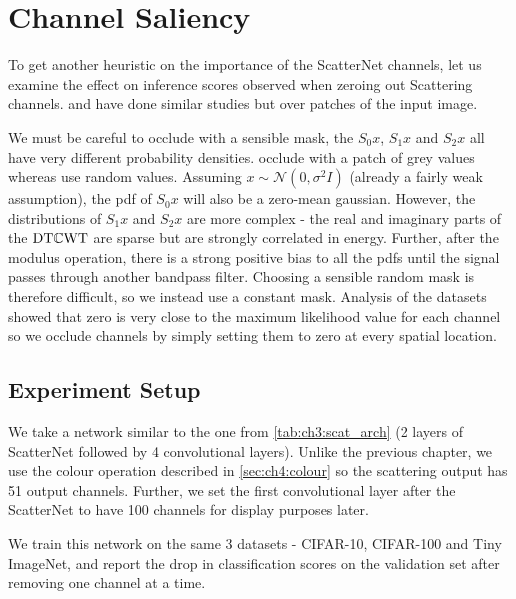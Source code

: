 \section{Channel Saliency}\label{sec:ch4:occlusion}
To get another heuristic on the importance of the ScatterNet channels, let us examine
the effect on inference scores observed when zeroing out Scattering channels.
\citeauthor{zeiler_visualizing_2014} \cite{zeiler_visualizing_2014} and 
\citeauthor{zhou_object_2014} \cite{zhou_object_2014} have done similar studies but
over patches of the input image. 

We must be careful to occlude with a sensible mask, the $S_0x$, $S_1x$ and $S_2x$
all have very different probability densities. \cite{zeiler_visualizing_2014}
occlude with a patch of grey values whereas \cite{zhou_object_2014} use random
values. Assuming $x \sim \mathcal{N}(0, \sigma^2I)$ (already a fairly weak
assumption), the pdf of $S_0x$ will also be a zero-mean gaussian. However, the
distributions of $S_1x$ and $S_2x$ are more complex - the real and imaginary
parts of the $\mathrm{DT}\mathbb{C}\mathrm{WT}$ are sparse but are strongly correlated in energy. Further,
after the modulus operation, there is a strong positive bias to all the pdfs
until the signal passes through another bandpass filter. Choosing a sensible
random mask is therefore difficult, so we instead use a constant mask. Analysis
of the datasets showed that zero is very close to the maximum likelihood value for
each channel so we occlude channels by simply setting them to zero at every
spatial location.

\subsection{Experiment Setup}
We take a network similar to the one from
\autoref{tab:ch3:scat_arch} (2 layers of ScatterNet followed by 4 convolutional
layers). Unlike the previous chapter, we use the colour operation described in 
\autoref{sec:ch4:colour} so the scattering output has 51 output channels. Further,
we set the first convolutional layer after the ScatterNet to have 
100 channels for display purposes later. 

We train this network on the same 3 datasets - CIFAR-10, CIFAR-100 and Tiny ImageNet, and report the
drop in classification scores on the validation set after removing one channel at
a time. 

